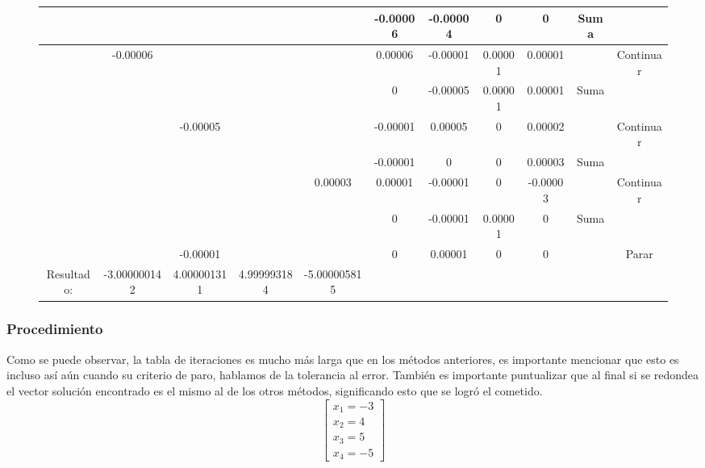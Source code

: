 \documentclass{article}
\begin{document}
\begin{figure}[H]
\begin{adjustwidth}{-4cm}{0cm}
{\begin{tabular}{|c|c|c|c|c|c|c|c|c|c|c|}
               &       &       &       &       &   -0.00006    &   -0.00004    &   0   &   0   &   Suma    &       \\ \hline
               &   -0.00006    &       &       &       &   0.00006 &   -0.00001    &   0.00001 &   0.00001 &       &   Continuar   \\ \rowcolor{lightgray}
               &       &       &       &       &   0   &   -0.00005    &   0.00001 &   0.00001 &   Suma    &       \\ \hline
               &       &   -0.00005    &       &       &   -0.00001    &   0.00005 &   0   &   0.00002 &       &   Continuar   \\ \rowcolor{lightgray}
               &       &       &       &       &   -0.00001    &   0   &   0   &   0.00003 &   Suma    &       \\ \hline
               &       &       &       &   0.00003 &   0.00001 &   -0.00001    &   0   &   -0.00003    &       &   Continuar   \\ \rowcolor{lightgray}
               &       &       &       &       &   0   &   -0.00001    &   0.00001 &   0   &   Suma    &       \\ \hline
               &       &   -0.00001    &       &       &   0   &   0.00001 &   0   &   0   &       &   Parar   \\ \rowcolor{lightgray}
           Resultado:  &   -3.000000142    &   4.000001311 &   4.999993184 &   -5.000005815    &       &       &       &       &       &       \\ \hline
           \end{tabular}
       }
   \end{adjustwidth}
  
\end{figure}
\newpage
\subsubsection{Procedimiento}
Como se puede observar, la tabla de iteraciones es mucho más larga que en los métodos anteriores, es importante mencionar que esto es incluso así
aún cuando su criterio de paro, hablamos de la tolerancia al error. También es importante puntualizar que al final si se redondea el
vector solución encontrado es el mismo al de los otros métodos, significando esto que se logró el cometido.
\begin{equation*}
   \begin{bmatrix}
       x_1 = -3 \\
       x_2 = 4 \\
       x_3 = 5 \\
       x_4 = -5
   \end{bmatrix}
\end{equation*}
\end{document}
